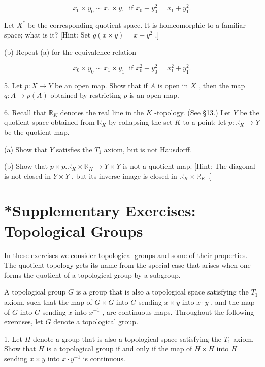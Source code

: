 \documentclass[10pt]{article}
\begin{document}
\[
{x}_{0} \times  {y}_{0} \sim  {x}_{1} \times  {y}_{1}\;\text{ if }{x}_{0} + {y}_{0}^{2} = {x}_{1} + {y}_{1}^{2}.
\]

Let \({X}^{ * }\) be the corresponding quotient space. It is homeomorphic to a familiar space; what is it? [Hint: Set \(g\left( {x \times  y}\right)  = x + {y}^{2}\) .]

(b) Repeat (a) for the equivalence relation

\[
{x}_{0} \times  {y}_{0} \sim  {x}_{1} \times  {y}_{1}\;\text{ if }{x}_{0}^{2} + {y}_{0}^{2} = {x}_{1}^{2} + {y}_{1}^{2}.
\]

5. Let \(p : X \rightarrow  Y\) be an open map. Show that if \(A\) is open in \(X\) , then the map \(q : A \rightarrow  p\left( A\right)\) obtained by restricting \(p\) is an open map.

6. Recall that \({\mathbb{R}}_{K}\) denotes the real line in the \(K\) -topology. (See §13.) Let \(Y\) be the quotient space obtained from \({\mathbb{R}}_{K}\) by collapsing the set \(K\) to a point; let \(p : {\mathbb{R}}_{K} \rightarrow  Y\) be the quotient map.

(a) Show that \(Y\) satisfies the \({T}_{1}\) axiom, but is not Hausdorff.

(b) Show that \(p \times  p.{\mathbb{R}}_{K} \times  {\mathbb{R}}_{K} \rightarrow  Y \times  Y\) is not a quotient map. [Hint: The diagonal is not closed in \(Y \times  Y\) , but its inverse image is closed in \({\mathbb{R}}_{K} \times  {\mathbb{R}}_{K}\) .]

\section*{*Supplementary Exercises: Topological Groups}

In these exercises we consider topological groups and some of their properties. The quotient topology gets its name from the special case that arises when one forms the quotient of a topological group by a subgroup.

A topological group \(G\) is a group that is also a topological space satisfying the \({T}_{1}\) axiom, such that the map of \(G \times  G\) into \(G\) sending \(x \times  y\) into \(x \cdot  y\) , and the map of \(G\) into \(G\) sending \(x\) into \({x}^{-1}\) , are continuous maps. Throughout the following exercises, let \(G\) denote a topological group.

1. Let \(H\) denote a group that is also a topological space satisfying the \({T}_{1}\) axiom. Show that \(H\) is a topological group if and only if the map of \(H \times  H\) into \(H\) sending \(x \times  y\) into \(x \cdot  {y}^{-1}\) is continuous.
\end{document}
